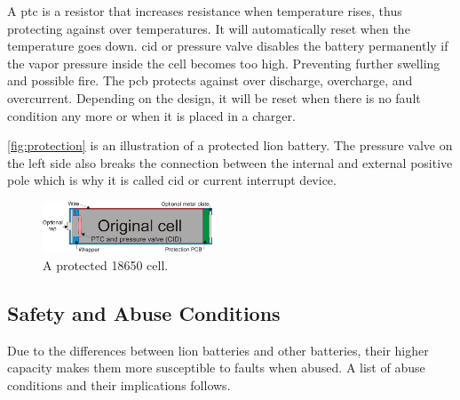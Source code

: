 A \gls{ptc} is a resistor that increases resistance when temperature rises, thus protecting against over temperatures. It will automatically reset when the temperature goes down.
\gls{cid} or pressure valve disables the battery permanently if the vapor pressure inside the cell becomes too high. Preventing further swelling and possible fire.
The \gls{pcb} protects against over discharge, overcharge, and overcurrent. Depending on the design, it will be reset when there is no fault condition any more or when it is placed in a charger.  

\autoref{fig:protection} is an illustration of a protected \gls{lion} battery. The pressure valve on the left side also breaks the connection between the internal and external positive pole which is why it is called \gls{cid} or current interrupt device.

\begin{figure}[H]
	\centering
	\includegraphics[width=0.45\textwidth]{Figures/protection.png}
	\caption{A protected 18650 cell.}
	\label{fig:protection}
\end{figure}

\subsection{Safety and Abuse Conditions}

Due to the differences between \gls{lion} batteries and other batteries, their higher capacity makes them more susceptible to faults when abused. A list of abuse conditions and their implications follows\cite[p.35-38]{book}.


